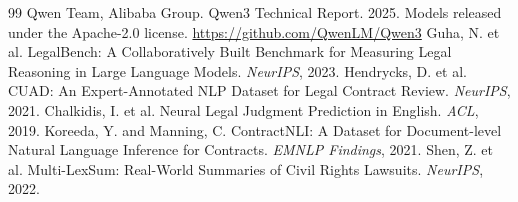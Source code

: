 \documentclass[11pt,a4paper]{article}
\begin{document}
\begin{thebibliography}{99}
 Qwen Team, Alibaba Group. Qwen3 Technical Report. 2025. Models released under the Apache-2.0 license. \url{https://github.com/QwenLM/Qwen3}
 Guha, N. et al. LegalBench: A Collaboratively Built Benchmark for Measuring Legal Reasoning in Large Language Models. \textit{NeurIPS}, 2023.
 Hendrycks, D. et al. CUAD: An Expert-Annotated NLP Dataset for Legal Contract Review. \textit{NeurIPS}, 2021.
 Chalkidis, I. et al. Neural Legal Judgment Prediction in English. \textit{ACL}, 2019.
 Koreeda, Y. and Manning, C. ContractNLI: A Dataset for Document-level Natural Language Inference for Contracts. \textit{EMNLP Findings}, 2021.
 Shen, Z. et al. Multi-LexSum: Real-World Summaries of Civil Rights Lawsuits. \textit{NeurIPS}, 2022.
\end{thebibliography}
\end{document}
